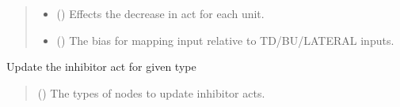 \documentclass[letterpaper,10pt,english]{sphinxmanual}
\begin{document}
\begin{fulllineitems}
\begin{fulllineitems}
\begin{quote}
\begin{description}
\begin{itemize}
\item {} 
\sphinxAtStartPar
{} () \textendash{} Effects the decrease in act for each unit.

\item {} 
\sphinxAtStartPar
{} () \textendash{} The bias for mapping input relative to TD/BU/LATERAL inputs.

\end{itemize}

\end{description}\end{quote}

\end{fulllineitems}


\begin{fulllineitems}
\label{\detokenize{nodes:nodes.nodeTensors.Tokens.update_inhibitor_act}}
\pysigstartsignatures
\pysiglinewithargsret
{}
{}
{}
\pysigstopsignatures
\sphinxAtStartPar
Update the inhibitor act for given type
\begin{quote}\begin{description}
\sphinxAtStartPar
{} (\sphinxstyleliteralemphasis{\sphinxupquote{{[}}}{\hyperref[\detokenize{nodes:nodes.nodeEnums.Type}]{\sphinxcrossref{\sphinxstyleliteralemphasis{\sphinxupquote{Type}}}}}\sphinxstyleliteralemphasis{\sphinxupquote{{]}}}) \textendash{} The types of nodes to update inhibitor acts.

\end{description}\end{quote}

\end{fulllineitems}



\end{fulllineitems}
\end{document}
